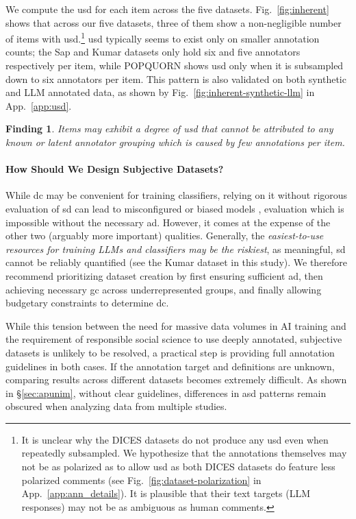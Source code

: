 \documentclass[manuscript,screen,review,anonymous]{acmart}
\theoremstyle{acmplain}
\newtheorem{finding}{Finding}
\theoremstyle{researchquestionstyle}
\begin{document}
We compute the \ac{usd} for each item across the five datasets. Fig.~\ref{fig:inherent} shows that across our five datasets, three of them show a non-negligible number of items with \ac{usd}.\footnote{It is unclear why the DICES datasets do not produce any \ac{usd} even when repeatedly subsampled. We hypothesize that the annotations themselves may not be as polarized as to allow \ac{usd} as both DICES datasets do feature less polarized comments (see Fig.~\ref{fig:dataset-polarization} in App.~\ref{app:ann_details}). It is plausible that their text targets (LLM responses) may not be as ambiguous as human comments.} \ac{usd} typically seems to exist only on smaller annotation counts; the Sap and Kumar datasets only hold six and five annotators respectively per item, while POPQUORN shows \ac{usd} only when it is subsampled down to six annotators per item. This pattern is also validated on both synthetic and LLM annotated data, as shown by Fig.~\ref{fig:inherent-synthetic-llm} in App.~\ref{app:usd}.

\begin{finding}
	\label{finding:inherent}
	Items may exhibit a degree of \ac{usd} that cannot be attributed to any known or latent annotator grouping which is caused by few annotations per item.
\end{finding}

\paragraph{How Should We Design Subjective Datasets?} While \ac{dc} may be convenient for training classifiers, relying on it without rigorous evaluation of \ac{sd} can lead to misconfigured or biased models \citep{sap-etal-2019-risk}, evaluation which is impossible without the necessary \ac{ad}. However, it comes at the expense of the other two (arguably more important) qualities. Generally, the \emph{easiest-to-use resources for training LLMs and classifiers may be the riskiest}, as meaningful, \ac{sd} cannot be reliably quantified (see the Kumar dataset in this study). We therefore recommend prioritizing dataset creation by first ensuring sufficient \ac{ad}, then achieving necessary \ac{gc} across underrepresented groups, and finally allowing budgetary constraints to determine \ac{dc}.

While this tension between the need for massive data volumes in AI training and the requirement of responsible social science to use deeply annotated, subjective datasets is unlikely to be resolved, a practical step is providing full annotation guidelines in both cases. If the annotation target and definitions are unknown, comparing results across different datasets becomes extremely difficult. As shown in \S\ref{sec:apunim}, without clear guidelines, differences in \ac{asd} patterns remain obscured when analyzing data from multiple studies.
\end{document}
